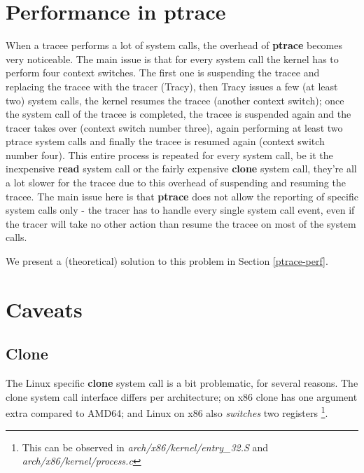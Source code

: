 \documentclass[a4paper, 10pt]{report}
\begin{document}


\section{Performance in ptrace}
\label{ptrace-perf-problems}

When a tracee performs a lot of system calls, the overhead of \textbf{ptrace}
becomes very noticeable. The main issue is that for every system call the kernel
has to perform four context switches. The first one is suspending the tracee
and replacing the tracee with the tracer (Tracy), then Tracy issues a few
(at least two) system calls, the kernel resumes the tracee (another context
switch); once the system call of the tracee is completed, the tracee is
suspended again and the tracer takes over (context switch number three),
again performing at least two ptrace system calls and finally the tracee
is resumed again (context switch number four). This entire process is
repeated for every system call, be it the inexpensive \textbf{read}
system call or the fairly expensive \textbf{clone} system call, they're
all a lot slower for the tracee due to this overhead of suspending and
resuming the tracee. The main issue here is that \textbf{ptrace} does
not allow the reporting of specific system calls only - the tracer has
to handle every single system call event, even if the tracer will take no
other action than resume the tracee on most of the system calls.

We present a (theoretical) solution to this problem in
Section \ref{ptrace-perf}.

\section{Caveats}


\subsection{Clone}

The Linux specific \textbf{clone} system call is a bit problematic, for
several reasons. The clone system call interface differs per architecture;
on x86 clone has one argument extra compared to AMD64; and Linux on x86
also \textit{switches} two registers
\footnote{This can be observed in \textit{arch/x86/kernel/entry\_32.S}
and \textit{arch/x86/kernel/process.c}}.
\end{document}
